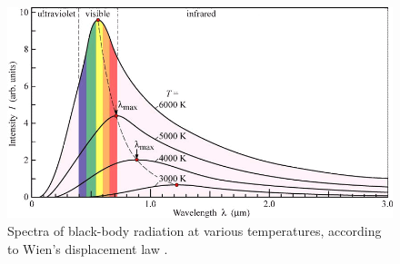 \begin{rotatepage}
\begin{figure}
    \centering
    \includegraphics[width=\textwidth]{graphics/sampleFig2.png}
    \caption[Black-body radiation]{Spectra of black-body radiation at various temperatures, according to Wien's displacement law \cite{wannier1987statistical}.}
    \label{fig:secondFig}
\end{figure}
\end{rotatepage}
